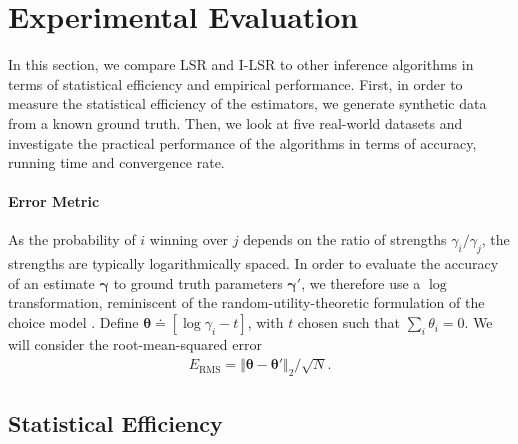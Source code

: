 \section{Experimental Evaluation}
\label{fi:sec:experimental}

In this section, we compare LSR and I-LSR to other inference algorithms in terms of statistical efficiency and empirical performance.
First, in order to measure the statistical efficiency of the estimators, we generate synthetic data from a known ground truth.
Then, we look at five real-world datasets and investigate the practical performance of the algorithms in terms of accuracy, running time and convergence rate.

\paragraph{Error Metric}
As the probability of $i$ winning over $j$ depends on the ratio of strengths $\gamma_i / \gamma_j$, the strengths are typically logarithmically spaced.
In order to evaluate the accuracy of an estimate $\bm{\gamma}$ to ground truth parameters $\bm{\gamma}'$, we therefore use a $\log$ transformation, reminiscent of the random-utility-theoretic formulation of the choice model \citep{mcfadden1973conditional,hajek2014minimax}.
Define $\bm{\theta} \doteq[\log \gamma_i - t]$, with $t$ chosen such that $\sum_i \theta_i = 0$.
We will consider the root-mean-squared error
\begin{align*}
E_{\text{RMS}} = \Vert \bm{\theta} - \bm{\theta}' \Vert_2 / \sqrt{N}.
\end{align*}

\subsection{Statistical Efficiency}

